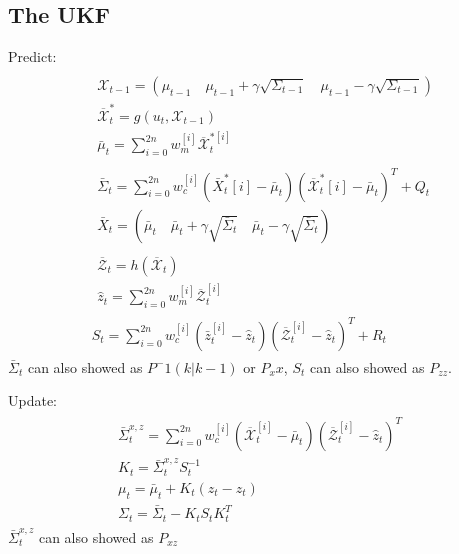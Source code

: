 \documentclass[dvipdfmx]{jsarticle}
\begin{document}
\subsection*{The UKF}
Predict:
\begin{equation}\nonumber\label{Func.}\begin{aligned}
  \begin{aligned}
    &\begin{array}{l}
    \mathcal{X}_{t-1}=\left(\mu_{t-1} \quad \mu_{t-1}+\gamma \sqrt{\Sigma_{t-1}} \quad \mu_{t-1}-\gamma \sqrt{\Sigma_{t-1}}\right) \\
    \overline{\mathcal{X}}_{t}^{*}=g\left(u_{t}, \mathcal{X}_{t-1}\right) \\
    \bar{\mu}_{t}=\sum_{i=0}^{2 n} w_{m}^{[i]} \overline{\mathcal{X}}_{t}^{*[i]}
    \end{array}\\
    &\begin{array}{l}
    \bar{\Sigma}_{t}=\sum_{i=0}^{2 n} w_{c}^{[i]}\left(\bar{X}_{t}^{*}[i]-\bar{\mu}_{t}\right)\left(\overline{\mathcal{X}}_{t}^{*}[i]-\bar{\mu}_{t}\right)^{T}+Q_{t} \\
    \bar{X}_{t}=\left(\bar{\mu}_{t} \quad \bar{\mu}_{t}+\gamma \sqrt{\bar{\Sigma}_{t}} \quad \bar{\mu}_{t}-\gamma \sqrt{\bar{\Sigma}_{t}}\right)
    \end{array}\\
    &\begin{array}{l}
    \overline{\mathcal{Z}}_{t}=h\left(\overline{\mathcal{X}}_{t}\right) \\
    \hat{z}_{t}=\sum_{i=0}^{2 n} w_{m}^{[i]} \overline{\mathcal{Z}}_{t}^{[i]}
    \end{array}\\
    &S_{t}=\sum_{i=0}^{2 n} w_{c}^{[i]}\left(\bar{z}_{t}^{[i]}-\hat{z}_{t}\right)\left(\overline{\mathcal{Z}}_{t}^{[i]}-\hat{z}_{t}\right)^{T}+R_{t} \quad
    \end{aligned}
\end{aligned}\end{equation}
$\bar{\Sigma}_{t}$ can also showed as $P^-1(k|k-1)$ or $P_xx$, $S_{t}$ can also showed as $P_{zz}$.


Update:
\begin{equation}\nonumber\label{Func.}\begin{aligned}
  \begin{array}{l}
    \bar{\Sigma}_{t}^{x, z}=\sum_{i=0}^{2 n} w_{c}^{[i]}\left(\overline{\mathcal{X}}_{t}^{[i]}-\bar{\mu}_{t}\right)\left(\overline{\mathcal{Z}}_{t}^{[i]}-\hat{z}_{t}\right)^{T} \\
    K_{t}=\bar{\Sigma}_{t}^{x, z} S_{t}^{-1} \\
    \mu_{t}=\bar{\mu}_{t}+K_{t}\left(z_{t}-\hat{z}_{t}\right) \\
    \Sigma_{t}=\bar{\Sigma}_{t}-K_{t} S_{t} K_{t}^{T}
    \end{array}
\end{aligned}\end{equation}
$\bar{\Sigma}_{t}^{x, z}$ can also showed as $P_{xz}$
\end{document}

